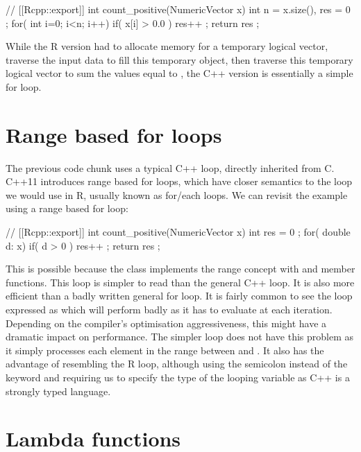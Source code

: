 \begin{example}
// [[Rcpp::export]]
int count_positive(NumericVector x){
  int n = x.size(), res = 0 ;
  for( int i=0; i<n; i++) if( x[i] > 0.0 ) res++ ;
  return res ;
}
\end{example}

While the R version had to allocate memory for a temporary logical 
vector, traverse the input data to fill this temporary object, then 
traverse this temporary logical vector to sum the values equal to , 
the C++ version is essentially a simple for loop. 

\section{Range based for loops}

The previous code chunk uses a typical C++  loop, directly 
inherited from C. C++11 introduces range based for loops, which have 
closer semantics to the loop we would use in R, usually known as
for/each loops. We can revisit the example using a range based for loop:

\begin{example}
// [[Rcpp::export]]
int count_positive(NumericVector x){
  int res = 0 ;
  for( double d: x){
    if( d > 0 ) res++ ;
  }
  return res ;
}
\end{example}

This is possible because the  class implements 
the range concept with  and  member functions. This 
 loop is simpler to read than the general C++  loop. It is also
more efficient than a badly written general for loop. It is fairly 
common to see the loop expressed as  which 
will perform badly as it has to evaluate  at each iteration. 
Depending on the compiler's optimisation aggressiveness, this might have a 
dramatic impact on performance. The simpler  loop does not 
have this problem as it simply processes each element in the range between 
 and . It also has the advantage of 
resembling the R loop, although using the semicolon instead of the  keyword
and requiring us to specify the type of the looping variable  as C++
is a strongly typed language.  

\section{Lambda functions}

